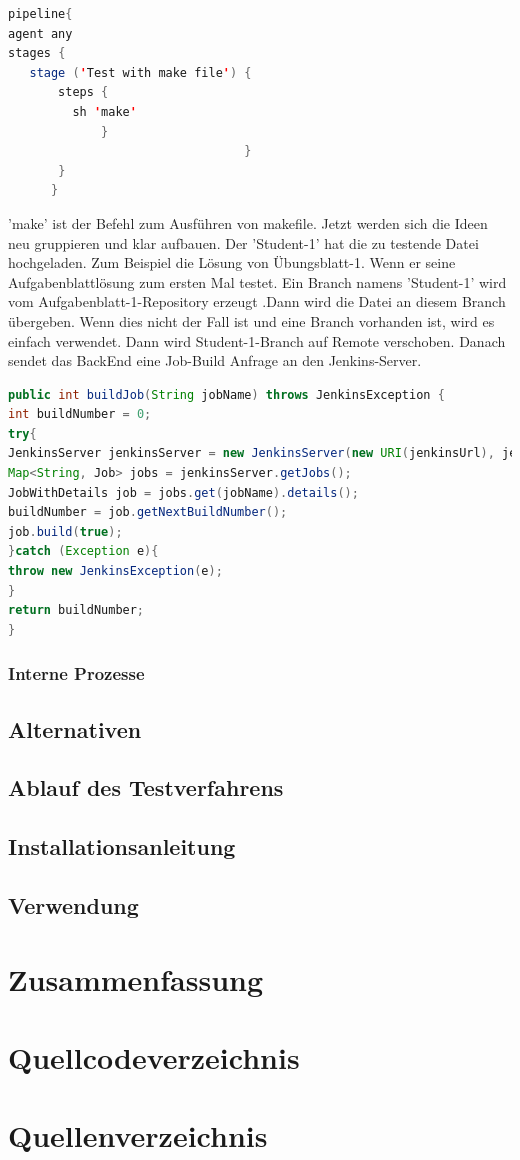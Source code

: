 \documentclass[apaper4,12p]{scrartcl}
\begin{document}
\begin{lstlisting}[language=JAVA,caption=Jenkinsfile (Job-Pipeline-Skript) ]
pipeline{
agent any
stages {   
   stage ('Test with make file') {
       steps {
         sh 'make'
             }
                                 }
       }
      }
\end{lstlisting} 
'make' ist der Befehl zum Ausführen von makefile.
\newline
Jetzt werden sich die Ideen neu gruppieren und klar aufbauen. Der 'Student-1' hat die zu testende Datei hochgeladen. Zum Beispiel die Lösung von Übungsblatt-1. Wenn er seine Aufgabenblattlösung zum ersten Mal testet. Ein Branch namens 'Student-1' wird vom Aufgabenblatt-1-Repository erzeugt .Dann wird die Datei an diesem Branch übergeben. Wenn dies nicht der Fall ist und eine Branch vorhanden ist, wird es einfach verwendet. Dann wird Student-1-Branch auf Remote verschoben. Danach sendet das BackEnd eine Job-Build Anfrage an den Jenkins-Server. 
\begin{lstlisting}[language=JAVA,caption=Job-Build Anfrage ]
	public int buildJob(String jobName) throws JenkinsException {
int buildNumber = 0;
try{
JenkinsServer jenkinsServer = new JenkinsServer(new URI(jenkinsUrl), jenkinsUser, jenkinsPassword);
Map<String, Job> jobs = jenkinsServer.getJobs();
JobWithDetails job = jobs.get(jobName).details();
buildNumber = job.getNextBuildNumber();
job.build(true);
}catch (Exception e){
throw new JenkinsException(e);
}
return buildNumber;
}
\end{lstlisting} 

\subsubsection{Interne Prozesse}
\subsection{Alternativen}
\subsection{Ablauf des Testverfahrens}
\subsection{Installationsanleitung}
\subsection{Verwendung}
\section{Zusammenfassung}
\listoffigures
\section{Quellcodeverzeichnis}
\section{Quellenverzeichnis}
\end{document}
